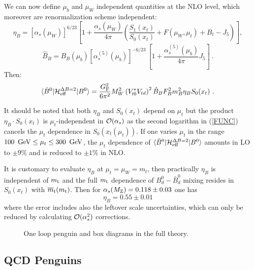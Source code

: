 \documentclass[12pt]{article}
\def\as{\alpha_s}
\newcommand{\mt}{m_{\rm t}}
\newcommand{\mtb}{\overline{m}_{\rm t}}
\newcommand{\mz}{M_{\rm Z}}
\newcommand{\gev}{\, {\rm GeV}}
\newcommand{\be}{\begin{equation}}
\newcommand{\ee}{\end{equation}}
\newcommand{\ord}{{\cal O}}
\begin{document}
\begin{itemize}
\begin{itemize}
We can now define $\mu_b$ and $\mu_W$ independent quantities at
the NLO level, which moreover are renormalization scheme independent:
\be\label{ETANLO}
\eta_B=\left[\as(\mu_W)\right]^{6/23}\left[1+
\frac{\as(\mu_W)}{4\pi} \left(
 \frac{S_1(x_t)}{S_0(x_t)}+F(\mu_W,\mu_t)
+B_t - J_5\right)\right],
\ee
\begin{equation}\label{Def-Bpar0}
\hat B_{B} = B_{B}(\mu_b) \left[ \as^{(5)}(\mu_b) \right]^{-6/23} \,
\left[ 1 + \frac{\as^{(5)}(\mu_b)}{4\pi} J_5 \right]~.
\end{equation}
Then:
\begin{equation}\label{mhdb4}
\langle \bar B^0|{\cal H}^{\Delta B=2}_{\rm eff}|B^0\rangle
=\frac{G^2_{\rm F}}{6\pi^2}M^2_W
 \left(V^\ast_{tb}V_{td}\right)^2 
 \hat B_B F^2_B m^2_B \eta_B S_0(x_t)~.
\end{equation}

It should be noted that both $\eta_B$ and $S_0(x_t)$ depend on
$\mu_t$ but the product
$\eta_B \cdot S_0(x_t)$ is $\mu_t$-independent in $\ord(\as)$
as the second logarithm in (\ref{FUNC}) cancels the
$\mu_t$ dependence in $S_0(x_t(\mu_t))$. If one varies $\mu_t$ in the
range $100~\gev\le\mu_t\le 300~\gev$, the $\mu_t$ dependence of
$\langle \bar B^0|{\cal H}^{\Delta B=2}_{\rm eff}|B^0\rangle$ amounts in
LO to $\pm 9\%$ and is reduced to $\pm 1\%$ in NLO.

It is customary to evaluate $\eta_B$ at  $\mu_t=\mu_W=m_t$, then
practically $\eta_B$ is independent of $\mt$ and the full $\mt$
dependence of $B^0_d-\bar B^0_d$ mixing resides in $S_0(x_t)$ with
$\mtb(\mt)$. Then for $\as(\mz)=0.118\pm0.03$ one has
\be\label{etab}
\eta_B=0.55\pm 0.01
\ee
where the error includes also the leftover scale uncertainties,
which can only be reduced by calculating $\ord(\as^2)$ corrections.

\begin{figure}[hbt]
\vspace{0.10in}
\centerline{
\epsfysize=1.5in
}%
\vspace{0.08in}
\caption[]{One loop penguin and box diagrams in the full theory.
\label{L:14}}
\end{figure}

\subsection{QCD Penguins}
         \label{sec:HeffdF1:66}

\end{itemize}
\end{itemize}
\end{document}
